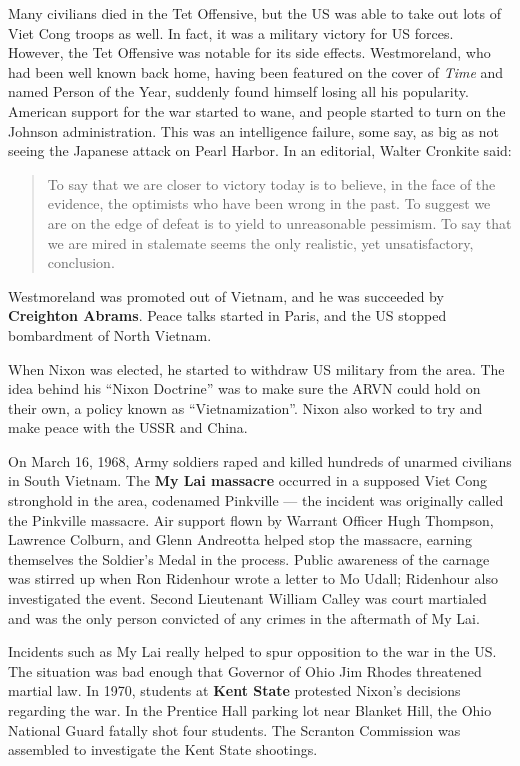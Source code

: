 Many civilians died in the Tet Offensive, but the US was able to take out lots of Viet Cong troops as well.
In fact, it was a military victory for US forces.
However, the Tet Offensive was notable for its side effects.
Westmoreland, who had been well known back home,
having been featured on the cover of \textit{Time} and named Person of the Year,
suddenly found himself losing all his popularity.
American support for the war started to wane, and people started to turn on the Johnson administration.
This was an intelligence failure, some say, as big as not seeing the Japanese attack on Pearl Harbor.
In an editorial, Walter Cronkite said:
\begin{quote}
  To say that we are closer to victory today is to believe, in the face of the evidence,
  the optimists who have been wrong in the past.
  To suggest we are on the edge of defeat is to yield to unreasonable pessimism.
  To say that we are mired in stalemate seems the only realistic, yet unsatisfactory, conclusion.
\end{quote}
Westmoreland was promoted out of Vietnam, and he was succeeded by \textbf{Creighton Abrams}.
Peace talks started in Paris, and the US stopped bombardment of North Vietnam.

When Nixon was elected, he started to withdraw US military from the area.
The idea behind his ``Nixon Doctrine'' was to make sure the ARVN could hold on their own,
a policy known as ``Vietnamization''.
Nixon also worked to try and make peace with the USSR and China.

On March 16, 1968, Army soldiers raped and killed hundreds of unarmed civilians in South Vietnam.
The \textbf{My Lai massacre} occurred in a supposed Viet Cong stronghold in the area, codenamed Pinkville ---
the incident was originally called the Pinkville massacre.
Air support flown by Warrant Officer Hugh Thompson, Lawrence Colburn, and Glenn Andreotta helped stop the massacre,
earning themselves the Soldier's Medal in the process.
Public awareness of the carnage was stirred up when Ron Ridenhour wrote a letter to Mo Udall;
Ridenhour also investigated the event.
Second Lieutenant William Calley was court martialed
and was the only person convicted of any crimes in the aftermath of My Lai.

Incidents such as My Lai really helped to spur opposition to the war in the US\@.
The situation was bad enough that Governor of Ohio Jim Rhodes threatened martial law.
In 1970, students at \textbf{Kent State} protested Nixon's decisions regarding the war.
In the Prentice Hall parking lot near Blanket Hill, the Ohio National Guard fatally shot four students.
The Scranton Commission was assembled to investigate the Kent State shootings.

